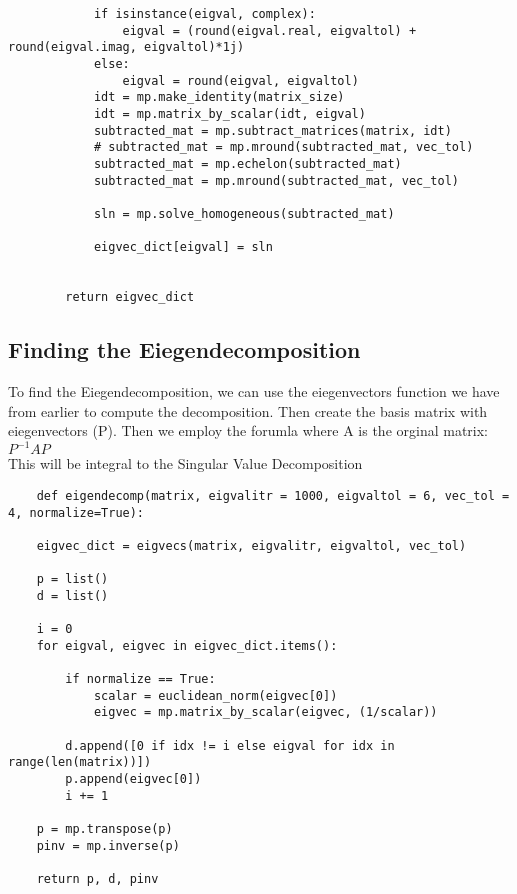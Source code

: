 \documentclass[12pt, a4paper]{article}
\begin{document}
\begin{lstlisting}
            if isinstance(eigval, complex):
                eigval = (round(eigval.real, eigvaltol) + round(eigval.imag, eigvaltol)*1j)
            else:
                eigval = round(eigval, eigvaltol)
            idt = mp.make_identity(matrix_size)
            idt = mp.matrix_by_scalar(idt, eigval)
            subtracted_mat = mp.subtract_matrices(matrix, idt)
            # subtracted_mat = mp.mround(subtracted_mat, vec_tol)
            subtracted_mat = mp.echelon(subtracted_mat)
            subtracted_mat = mp.mround(subtracted_mat, vec_tol)

            sln = mp.solve_homogeneous(subtracted_mat)
        
            eigvec_dict[eigval] = sln
        

        return eigvec_dict
\end{lstlisting}

\subsection{Finding the Eiegendecomposition}

To find the Eiegendecomposition, we can use the eiegenvectors function we have from earlier to compute the decomposition.
Then create the basis matrix with eiegenvectors (P). Then we employ the forumla where A is the orginal matrix:
\\
$P^{-1}AP$
\\
This will be integral to the Singular Value Decomposition

\begin{lstlisting}
    def eigendecomp(matrix, eigvalitr = 1000, eigvaltol = 6, vec_tol = 4, normalize=True):

    eigvec_dict = eigvecs(matrix, eigvalitr, eigvaltol, vec_tol)

    p = list()
    d = list()

    i = 0
    for eigval, eigvec in eigvec_dict.items():

        if normalize == True:
            scalar = euclidean_norm(eigvec[0])
            eigvec = mp.matrix_by_scalar(eigvec, (1/scalar))

        d.append([0 if idx != i else eigval for idx in range(len(matrix))])
        p.append(eigvec[0])
        i += 1

    p = mp.transpose(p)
    pinv = mp.inverse(p)
    
    return p, d, pinv
\end{lstlisting}
\end{document}
